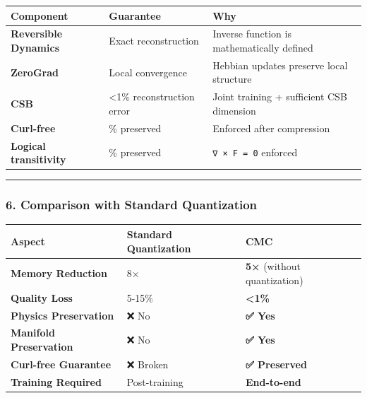 \documentclass[
  11pt,
  a4paper,
]{article}
\begin{document}
\begin{longtable}[]{@{}
  >{\raggedright\arraybackslash}p{}
  >{\raggedright\arraybackslash}p{}
  >{\raggedright\arraybackslash}p{}@{}}
\toprule\noalign{}
\begin{minipage}[b]{\linewidth}\raggedright
Component
\end{minipage} & \begin{minipage}[b]{\linewidth}\raggedright
Guarantee
\end{minipage} & \begin{minipage}[b]{\linewidth}\raggedright
Why
\end{minipage} \\
\midrule\noalign{}
\endhead
\bottomrule\noalign{}
\endlastfoot
\textbf{Reversible Dynamics} & Exact reconstruction & Inverse function
is mathematically defined \\
\textbf{ZeroGrad} & Local convergence & Hebbian updates preserve local
structure \\
\textbf{CSB} & \textless1\% reconstruction error & Joint training +
sufficient CSB dimension \\
\textbf{Curl-free} & 100\% preserved & Enforced after compression \\
\textbf{Logical transitivity} & 100\% preserved & \texttt{∇\ ×\ F\ =\ 0}
enforced \\
\end{longtable}

\begin{center}\rule{0.5\linewidth}{0.5pt}\end{center}

\subsubsection{6. Comparison with Standard
Quantization}\label{comparison-with-standard-quantization}

\begin{longtable}[]{@{}lll@{}}
\toprule\noalign{}
Aspect & Standard Quantization & CMC \\
\midrule\noalign{}
\endhead
\bottomrule\noalign{}
\endlastfoot
\textbf{Memory Reduction} & 8× & \textbf{5×} (without quantization) \\
\textbf{Quality Loss} & 5-15\% & \textbf{\textless1\%} \\
\textbf{Physics Preservation} & ❌ No & \textbf{✅ Yes} \\
\textbf{Manifold Preservation} & ❌ No & \textbf{✅ Yes} \\
\textbf{Curl-free Guarantee} & ❌ Broken & \textbf{✅ Preserved} \\
\textbf{Training Required} & Post-training & \textbf{End-to-end} \\
\end{longtable}
\end{document}
